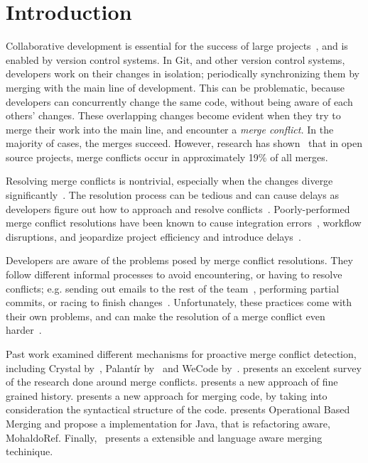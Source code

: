 
\section{Introduction}\label{introduction}

Collaborative development is essential for the success of large projects~\cite{hattori2010syde}, and is enabled by version control systems. 
In Git, and other version control systems, developers work on their changes in isolation; periodically synchronizing them by merging with the main line of development. 
This can be problematic, because developers can concurrently change the same code, without being aware of each others' changes.
These overlapping changes become evident when they try to merge their work into the main line, and encounter a \emph{merge conflict.}
In the majority of cases, the merges succeed.
However, research has shown~\cite{cassandra,Brun2011} that in open source projects, merge conflicts occur in approximately 19\% of all merges.

Resolving merge conflicts is nontrivial, especially when the changes diverge significantly~\cite{Brun2011}.
The resolution process can be tedious and can cause delays as developers figure out how to approach and resolve conflicts~\cite{cassandra}. 
Poorly-performed merge conflict resolutions have been known to cause integration errors~\cite{bird-branches-conflict}, workflow disruptions, and jeopardize project efficiency and introduce delays~\cite{estler2014awareness}. 

Developers are aware of the problems posed by merge conflict resolutions.
They follow different informal processes to avoid encountering, or having to resolve conflicts; e.g. sending out emails to the rest of the team~\cite{deSouza2003breaking}, performing partial commits, or racing to finish changes~\cite{cataldo2008distributed_dev}.
Unfortunately, these practices come with their own problems, and can make the resolution of a merge conflict even harder~\cite{Brun2011}. 

Past work examined different mechanisms for proactive merge conflict detection, including Crystal by~\cite{Brun2011}, Palant\'{i}r by~\cite{palantir} and WeCode by~\cite{Guimaraes}. 
\cite{mens2002state} presents an excelent survey of the research done around merge conflicts. 
\cite{nishimura} presents a new approach of fine grained history. 
\cite{apel_semistructured_2011,apel_structured_2012-1} presents a new approach for merging code, by taking into consideration the syntactical structure of the code. 
\cite{lippe_operation-based_1992} presents Operational Based Merging and \cite{danny2008tse} propose a implementation for Java, that is refactoring aware, MohaldoRef.
Finally,~\cite{hunt2002extensible} presents a extensible and language aware merging techinique.

